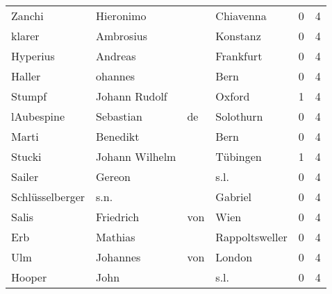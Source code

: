 \begin{center}
\begin{tiny}
\begin{longtabu}{llllrr}
                   Zanchi &                          Hieronimo &             &                                   Chiavenna &          0 &         4 \\
                   klarer &                          Ambrosius &             &                                    Konstanz &          0 &         4 \\
                 Hyperius &                            Andreas &             &                                   Frankfurt &          0 &         4 \\
                   Haller &                            ohannes &             &                                        Bern &          0 &         4 \\
                   Stumpf &                      Johann Rudolf &             &                                      Oxford &          1 &         4 \\
               lAubespine &                          Sebastian &          de &                                   Solothurn &          0 &         4 \\
                    Marti &                           Benedikt &             &                                        Bern &          0 &         4 \\
                   Stucki &                     Johann Wilhelm &             &                                    Tübingen &          1 &         4 \\
                   Sailer &                             Gereon &             &                                        s.l. &          0 &         4 \\
          Schlüsselberger &                               s.n. &             &                                     Gabriel &          0 &         4 \\
                    Salis &                          Friedrich &         von &                                        Wien &          0 &         4 \\
                      Erb &                            Mathias &             &                              Rappoltsweller &          0 &         4 \\
                      Ulm &                           Johannes &         von &                                      London &          0 &         4 \\
                   Hooper &                               John &             &                                        s.l. &          0 &         4 \\

\end{longtabu}
\end{tiny}
\end{center}
